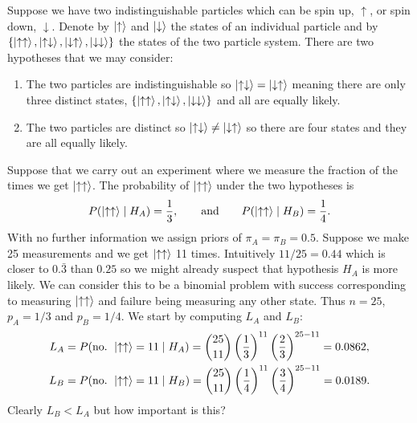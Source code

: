 \documentclass[a4paper]{article}
\newcommand{\st}{\mid}
\newcommand{\spinUp}{\uparrow}
\newcommand{\spinDown}{\downarrow}
\begin{document}
    \begin{example}
        Suppose we have two indistinguishable particles which can be spin up, \(\spinUp\), or spin down, \(\spinDown\).
        Denote by \(\ket{\spinUp}\) and \(\ket{\spinDown}\) the states of an individual particle and by \(\{\ket{\spinUp\spinUp}, \ket{\spinUp\spinDown}, \ket{\spinDown\spinUp}, \ket{\spinDown\spinDown}\}\) the states of the two particle system.
        There are two hypotheses that we may consider:
        \begin{enumerate}[label=\(H_{\Alph{*}}\)]
            \item The two particles are indistinguishable so \(\ket{\spinUp\spinDown} = \ket{\spinDown\spinUp}\) meaning there are only three distinct states, \(\{\ket{\spinUp\spinUp}, \ket{\spinUp\spinDown}, \ket{\spinDown\spinDown}\}\) and all are equally likely.
            \item The two particles are distinct so \(\ket{\spinUp\spinDown} \ne \ket{\spinDown\spinUp}\) so there are four states and they are all equally likely.
        \end{enumerate}
        Suppose that we carry out an experiment where we measure the fraction of the times we get \(\ket{\spinUp\spinUp}\).
        The probability of \(\ket{\spinUp\spinUp}\) under the two hypotheses is
        \[P(\ket{\spinUp\spinUp}\st H_A) = \frac{1}{3}, \qquad\text{and}\qquad P(\ket{\spinUp\spinUp}\st H_B) = \frac{1}{4}.\]
        With no further information we assign priors of \(\pi_A = \pi_B = 0.5\).
        Suppose we make 25 measurements and we get \(\ket{\spinUp\spinUp}\) 11 times.
        Intuitively \(11/25 = 0.44\) which is closer to \(0.\bar{3}\) than \(0.25\) so we might already suspect that hypothesis \(H_A\) is more likely.
        We can consider this to be a binomial problem with success corresponding to measuring \(\ket{\spinUp\spinUp}\) and failure being measuring any other state.
        Thus \(n = 25\), \(p_A = 1/3\) and \(p_B = 1/4\).
        We start by computing \(L_A\) and \(L_B\):
        \begin{align*}
            L_A &= P(\text{no. }\ket{\spinUp\spinUp} = 11\st H_A) = \binom{25}{11}\left(\frac{1}{3}\right)^{11} \left(\frac{2}{3}\right)^{25-11} = 0.0862,\\
            L_B &= P(\text{no. }\ket{\spinUp\spinUp} = 11\st H_B) = \binom{25}{11}\left(\frac{1}{4}\right)^{11} \left(\frac{3}{4}\right)^{25-11} = 0.0189.\\
        \end{align*}
        Clearly \(L_B < L_A\) but how important is this?

\end{example}
\end{document}
